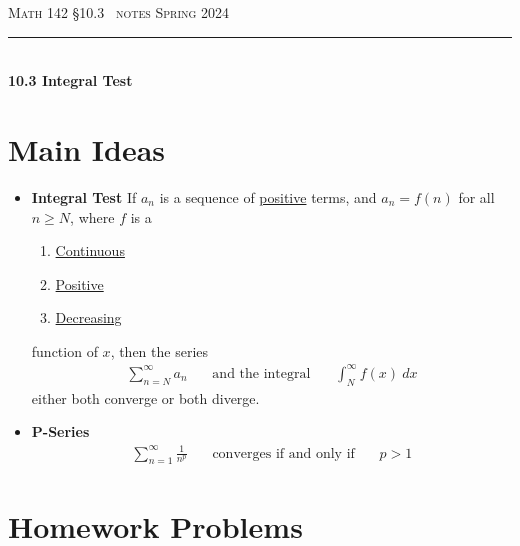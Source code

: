 \documentclass{article}
\def\chapt{10.3}
\begin{document}
\noindent
{\scshape Math 142} \hfill {\scshape \S\chapt~ notes} \hfill {\scshape Spring 2024}

\smallskip

\hrule

\bigskip

\hfill
\\

{
\huge
\noindent
\textbf{10.3 Integral Test}
}

\section*{Main Ideas}

\begin{itemize}
\item
\textbf{Integral Test}
If $a_n$ is a sequence of \underline{positive} terms,
and $a_n=f(n)$ for all $n\geq N$, where $f$ is a
\begin{enumerate}
\item
\underline{Continuous}
\item
\underline{Positive}
\item
\underline{Decreasing}
\end{enumerate}
function of $x$, then the series
\begin{gather*}
\sum_{n=N}^{\infty} a_n
~~~~~~~~\text{and the integral}~~~~~~~~
\int_N^{\infty}f(x)~dx
\end{gather*}
either both converge or both diverge.
\\

\item
\textbf{P-Series}
\\
\begin{gather*}
\sum_{n=1}^{\infty} \frac{1}{n^{p}}
~~~~~~~~\text{converges if and only if}~~~~~~~~
p>1
\end{gather*}

\end{itemize}

\newpage

%
%
%
%

\section*{Homework Problems}
\end{document}
